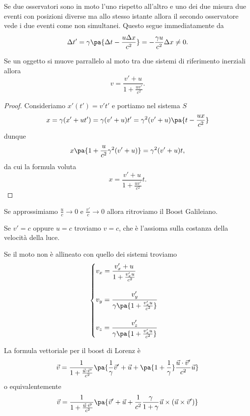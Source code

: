 \begin{example}
Se due osservatori sono in moto l'uno rispetto all'altro e uno dei due misura due eventi con posizioni diverse ma allo stesso istante allora il secondo osservatore vede i due eventi come non simultanei. Questo segue immediatamente da
\[\Delta t'=\gamma\pa{\Delta t-\frac{u\Delta x}{c^2}}=-\frac{\gamma u}{c^2} \Delta x\neq 0.\]
\end{example}


\begin{proposition}\label{FormulaBoost}
Se un oggetto si muove parrallelo al moto tra due sistemi di riferimento inerziali allora
\[v=\dfrac{v'+u}{\displaystyle 1+\frac{uv'}{c^2}}.\]
\end{proposition}
\begin{proof}
Consideriamo $x'(t')=v't'$ e portiamo nel sistema $S$
\[x=\gamma(x'+ut')=\gamma(v'+u)t'=\gamma^2(v'+u)\pa{t-\frac{ux}{c^2}}\]
dunque
\[x\pa{1+\frac u{c^2}\gamma^2(v'+u)}=\gamma^2(v'+u)t,\]
da cui la formula voluta
\[x=\frac{v'+u}{1+\frac{uv'}{c^2}}t.\]
\end{proof}

\begin{remark}
Se approssimiamo $\frac{u}{c}\to 0$ e $\frac{v'}{c}\to 0$ allora ritroviamo il Boost Galileiano.
\end{remark}

\begin{remark}
Se $v'=c$ oppure $u=c$ troviamo $v=c$, che \`e l'assioma sulla costanza della velocit\`a della luce.
\end{remark}

\begin{remark}
Se il moto non \`e allineato con quello dei sistemi troviamo
\[\begin{cases}
v_x=\dfrac{v_x'+u}{1+\frac{v_x' u}{c^2}}\\\\
v_y=\dfrac{v_y'}{\gamma\pa{1+\frac{v_x' u}{c^2}}}\\\\
v_z=\dfrac{v_z'}{\gamma\pa{1+\frac{v_x' u}{c^2}}}
\end{cases}\]
\end{remark}

\noindent La formula vettoriale per il boost di Lorenz \`e
\[\vec v=\frac1{1+\frac{\vec u\cdot \vec v'}{c^2}}\pa{\frac1\gamma \vec v'+\vec u+\pa{1+\frac1\gamma}\frac{\vec u\cdot \vec v'}{c^2}\vec u}\]
o equivalentemente
\[\vec v=\frac1{1+\frac{\vec u\cdot \vec v'}{c^2}}\pa{\vec v'+\vec u+\frac1{c^2}\frac{\gamma}{1+\gamma} \vec u\times (\vec u\times \vec v')}\]


